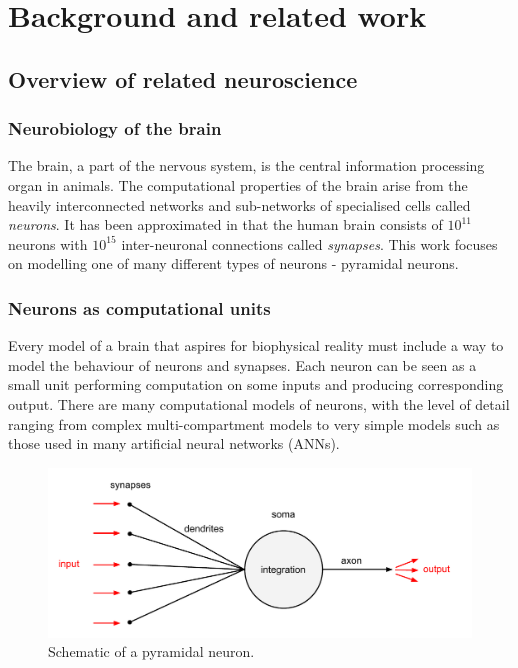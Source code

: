 \documentclass[a4paper,12pt]{report}
\theoremstyle{definition}
\begin{document}
\chapter{Background and related work}


\section{Overview of related neuroscience}

\subsection{Neurobiology of the brain} %
The brain, a part of the nervous system, is the central information processing organ in animals. The computational properties of the brain arise from the heavily interconnected networks and sub-networks of specialised cells called \emph{neurons}. It has been approximated in \cite{herculano2009human} that the human brain consists of $10^{11}$ neurons with $10^{15}$ inter-neuronal connections called \emph{synapses}. This work focuses on modelling one of many different types of neurons - pyramidal neurons.


\subsection{Neurons as computational units}
Every model of a brain that aspires for biophysical reality must include a way to model the behaviour of neurons and synapses. Each neuron can be seen as a small unit performing computation on some inputs and producing corresponding output. There are many computational models of neurons, with the level of detail ranging from complex multi-compartment models to very simple models such as those used in many artificial neural networks (ANNs). 

\begin{figure}[h]
    \includegraphics[width=\textwidth]{figures/fig1.pdf}
    \caption{Schematic of a pyramidal neuron.}
    \label{fig:pyramidal}
\end{figure}
\end{document}
